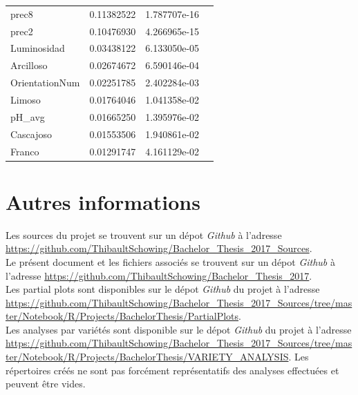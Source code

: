 \begin{table}[H]
\begin{tabular}{llll}
		prec8          & 0.11382522 & 1.787707e-16  \\
		prec2          & 0.10476930 & 4.266965e-15  \\
		Luminosidad    & 0.03438122 & 6.133050e-05  \\
		Arcilloso      & 0.02674672 & 6.590146e-04  \\
		OrientationNum & 0.02251785 & 2.402284e-03  \\
		Limoso         & 0.01764046 & 1.041358e-02  \\
		pH\_avg        & 0.01665250 & 1.395976e-02  \\
		Cascajoso      & 0.01553506 & 1.940861e-02  \\
		Franco         & 0.01291747 & 4.161129e-02 
	\end{tabular}
\end{table}















\chapter{Autres informations \label{annexeAutre}}
\noindent Les sources du projet se trouvent sur un dépot \textit{Github} à l'adresse \url{https://github.com/ThibaultSchowing/Bachelor_Thesis_2017_Sources}.\\


\noindent Le présent document et les fichiers associés se trouvent sur un dépot \textit{Github} à l'adresse \url{https://github.com/ThibaultSchowing/Bachelor_Thesis_2017}.\\



\noindent Les partial plots sont disponibles sur le dépot \textit{Github} du projet à l'adresse \url{https://github.com/ThibaultSchowing/Bachelor_Thesis_2017_Sources/tree/master/Notebook/R/Projects/BachelorThesis/PartialPlots}. \\


\noindent Les analyses par variétés sont disponible sur le dépot \textit{Github} du projet à l'adresse \url{https://github.com/ThibaultSchowing/Bachelor_Thesis_2017_Sources/tree/master/Notebook/R/Projects/BachelorThesis/VARIETY_ANALYSIS}. Les répertoires créés ne sont pas forcément représentatifs des analyses effectuées et peuvent être vides. \\





















